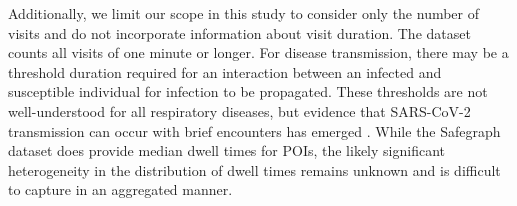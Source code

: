 \documentclass{article}
\begin{document}
Additionally, we limit our scope in this study to consider only the number of visits and do not incorporate information about visit duration. The dataset counts all visits of one minute or longer. For disease transmission, there may be a threshold duration required for an interaction between an infected and susceptible individual for infection to be propagated. These thresholds are not well-understood for all respiratory diseases, but evidence that SARS-CoV-2 transmission can occur with brief encounters has emerged \cite{pringle2020covid}. While the Safegraph dataset does provide median dwell times for POIs, the likely significant heterogeneity in the distribution of dwell times remains unknown and is difficult to capture in an aggregated manner.%
\end{document}
